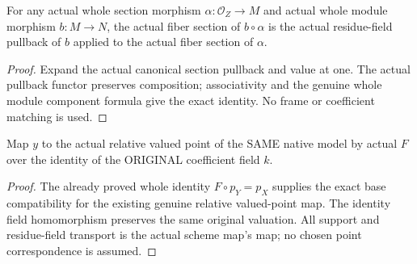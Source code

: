 \begin{lemma}
\label{lem:seven-original-fibre-section-postcomposition-route}
\leanok
{}
For any actual whole section morphism $\alpha:\mathcal O_Z\to M$ and
actual whole module morphism $b:M\to N$, the actual fiber section of
$b\circ\alpha$ is the actual residue-field pullback of $b$ applied to
the actual fiber section of $\alpha$.
\end{lemma}
\begin{proof}
Expand the actual canonical section pullback and value at one. The actual
pullback functor preserves composition; associativity and the genuine
whole module component formula give the exact identity. No frame or
coefficient matching is used.
\end{proof}

\begin{definition}
\label{def:seven-original-native-relative-valued-point-route}
\leanok
{}
Map $y$ to the actual relative valued point of the SAME native model by
actual $F$ over the identity of the ORIGINAL coefficient field $k$.
\end{definition}
\begin{proof}
The already proved whole identity $F\circ p_Y=p_X$ supplies the exact
base compatibility for the existing genuine relative valued-point map.
The identity field homomorphism preserves the same original valuation.
All support and residue-field transport is the actual scheme map's map;
no chosen point correspondence is assumed.
\end{proof}


